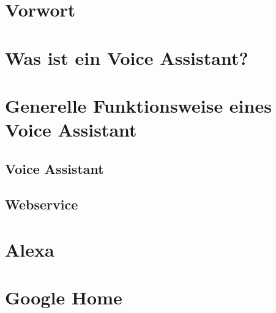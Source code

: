 

\section*{Vorwort}

\newpage

\section{Was ist ein Voice Assistant?}
\label{secOne}


\section{Generelle Funktionsweise eines Voice Assistant}
\label{secTwo}


\subsection{Voice Assistant}


\subsection{Webservice}


\section{Alexa}
\label{secThree}


\section{Google Home}
\label{secFour}



